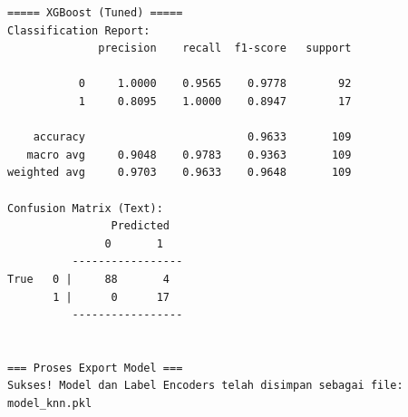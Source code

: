 \begin{lstlisting}[caption={Output 21}]
===== XGBoost (Tuned) =====
Classification Report:
              precision    recall  f1-score   support

           0     1.0000    0.9565    0.9778        92
           1     0.8095    1.0000    0.8947        17

    accuracy                         0.9633       109
   macro avg     0.9048    0.9783    0.9363       109
weighted avg     0.9703    0.9633    0.9648       109

Confusion Matrix (Text):
                Predicted
               0       1
          -----------------
True   0 |     88       4
       1 |      0      17
          -----------------


=== Proses Export Model ===
Sukses! Model dan Label Encoders telah disimpan sebagai file: model_knn.pkl
\end{lstlisting}



